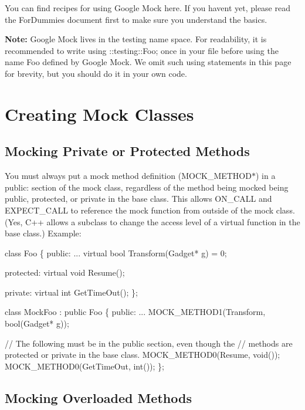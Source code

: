 You can find recipes for using Google Mock here. If you haven\textquotesingle{}t yet, please read the For\+Dummies document first to make sure you understand the basics.

{\bfseries Note\+:} Google Mock lives in the {\ttfamily testing} name space. For readability, it is recommended to write {\ttfamily using \+::testing\+::\+Foo;} once in your file before using the name {\ttfamily Foo} defined by Google Mock. We omit such {\ttfamily using} statements in this page for brevity, but you should do it in your own code.

\section*{Creating Mock Classes}

\subsection*{Mocking Private or Protected Methods}

You must always put a mock method definition ({\ttfamily M\+O\+C\+K\+\_\+\+M\+E\+T\+H\+O\+D$\ast$}) in a {\ttfamily public\+:} section of the mock class, regardless of the method being mocked being {\ttfamily public}, {\ttfamily protected}, or {\ttfamily private} in the base class. This allows {\ttfamily O\+N\+\_\+\+C\+A\+LL} and {\ttfamily E\+X\+P\+E\+C\+T\+\_\+\+C\+A\+LL} to reference the mock function from outside of the mock class. (Yes, C++ allows a subclass to change the access level of a virtual function in the base class.) Example\+:


\begin{DoxyCode}
class Foo \{
 public:
  ...
  virtual bool Transform(Gadget* g) = 0;

 protected:
  virtual void Resume();

 private:
  virtual int GetTimeOut();
\};

class MockFoo : public Foo \{
 public:
  ...
  MOCK\_METHOD1(Transform, bool(Gadget* g));

  // The following must be in the public section, even though the
  // methods are protected or private in the base class.
  MOCK\_METHOD0(Resume, void());
  MOCK\_METHOD0(GetTimeOut, int());
\};
\end{DoxyCode}


\subsection*{Mocking Overloaded Methods}


